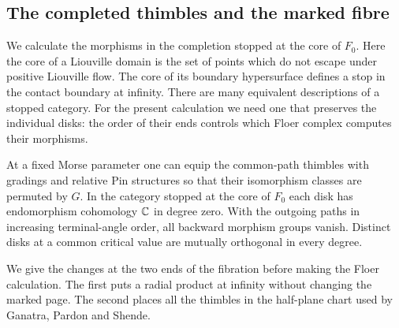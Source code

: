 \subsection{The completed thimbles and the marked fibre}\label{sec:completedthimbles}

We calculate the morphisms in the completion stopped at the core of $F_0$. Here the core of a Liouville domain is the set of points which do not escape under positive Liouville flow. The core of its boundary hypersurface defines a stop in the contact boundary at infinity. There are many equivalent descriptions of a stopped category. For the present calculation we need one that preserves the individual disks: the order of their ends controls which Floer complex computes their morphisms.

\begin{proposition}\label{prop:diskhoms}
At a fixed Morse parameter one can equip the common-path thimbles with gradings and relative Pin structures so that their isomorphism classes are permuted by $G$. In the category stopped at the core of $F_0$ each disk has endomorphism cohomology $\mathbb C$ in degree zero. With the outgoing paths in increasing terminal-angle order, all backward morphism groups vanish. Distinct disks at a common critical value are mutually orthogonal in every degree.
\end{proposition}

We give the changes at the two ends of the fibration before making the Floer calculation. The first puts a radial product at infinity without changing the marked page. The second places all the thimbles in the half-plane chart used by Ganatra, Pardon and Shende.

